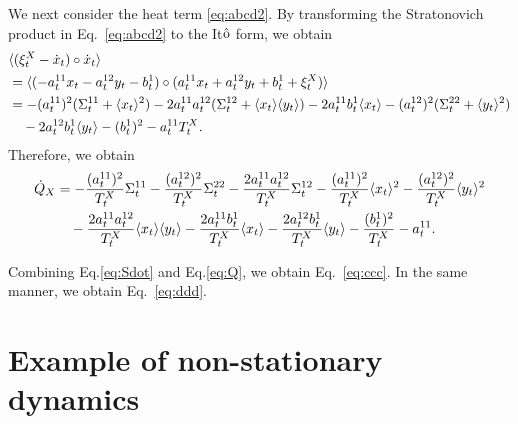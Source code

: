 \documentclass[%
 reprint,
 amsmath,amssymb,
 aps,
]{revtex4-1}
\newcommand{\balign}[1]{\begin{align} #1 \end{align}}
\newcommand{\average}[1]{\ensuremath{\langle#1\rangle} }
\newcommand{\eref}[1]{Eq.~\eqref{#1}}
\theoremstyle{plain}
\begin{document}
\begin{widetext}


We next consider the heat term \eqref{eq:abcd2}. By transforming the Stratonovich product in \eref{eq:abcd2} to the It$\hat{{\rm o}}$ form, we obtain
\balign{
&\average{(\xi_t^X-\dot{x}_t)\circ \dot{x}_t} \notag\\
&=\average{(-a_t^{11}x_t-a_t^{12}y_t-b_t^1)\circ (a_t^{11}x_t+a_t^{12}y_t+b_t^1+\xi_t^X)} \notag \\
&=-(a_t^{11})^2(\Sigma^{11}_t+\average{x_t}^2)-2a^{11}_ta^{12}_t(\Sigma_t^{12}+\average{x_t}\average{y_t})-2a_t^{11}b_t^1\average{x_t}-(a_t^{12})^2(\Sigma^{22}_t+\average{y_t}^2) \notag\\
&\ \ \ -2a_t^{12}b_t^1\average{y_t}-(b^1_t)^2-a_t^{11}T^X_t.
}
Therefore, we obtain
\balign{
\dot{Q}_{X}&=-\frac{(a_t^{11})^2}{T_t^X}\Sigma^{11}_t-\frac{(a_t^{12})^2}{T_t^X}\Sigma_t^{22}-\frac{2a_t^{11}a_t^{12}}{T_t^X}\Sigma^{12}_t-\frac{(a_t^{11})^2}{T_t^X}\average{x_t}^2-\frac{(a_t^{12})^2}{T_t^X}\average{y_t}^2 \notag \\
&\ \ \ -\frac{2a_t^{11}a_t^{12}}{T_t^X}\average{x_t}\average{y_t}-\frac{2a_t^{11}b_t^1}{T_t^X}\average{x_t}-\frac{2a_t^{12}b_t^1}{T_t^X}\average{y_t}-\frac{(b^1_t)^2}{T_t^X}-a_t^{11}. \label{eq:Q}
}

Combining Eq.\eqref{eq:Sdot} and Eq.\eqref{eq:Q}, we obtain \eref{eq:ccc}. In the same manner, we obtain \eref{eq:ddd}.
\end{widetext}

\section{Example of non-stationary dynamics}
\end{document}
